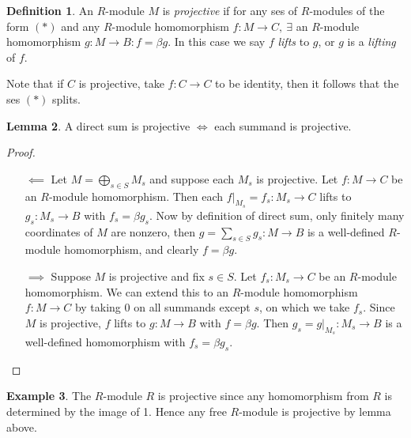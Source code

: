 \documentclass{article}
\theoremstyle{definition}
\newtheorem{defn}{Definition}[subsection]
\newtheorem{lemma}[defn]{Lemma}
\newtheorem{example}[defn]{Example}
\begin{document}
\begin{defn}
An $R$-module $M$ is \textit{projective} if for any ses of $R$-modules of the form $(\ast)$ and any $R$-module homomorphism $f:M\rightarrow C,\ \exists$ an $R$-module homomorphism $g:M\rightarrow B:f=\beta g$. In this case we say $f$ \textit{lifts} to $g$, or $g$ is a \textit{lifting} of $f$.

Note that if $C$ is projective, take $f:C\rightarrow C$ to be identity, then it follows that the ses $(\ast)$ splits. 
\end{defn}

\begin{lemma}
\label{lemma:MprojiffMsproj}
A direct sum is projective $\iff$ each summand is projective.
\end{lemma}
\begin{proof}
\begin{itemize}
\item[$\impliedby$] Let $M=\bigoplus_{s\in S}M_s$ and suppose each $M_s$ is projective. Let $f:M\rightarrow C$ be an $R$-module homomorphism. Then each $\left. f\right|_{M_s}=f_s:M_s\rightarrow C$ lifts to $g_s:M_s\rightarrow B$ with $f_s=\beta g_s$. Now by definition of direct sum, only finitely many coordinates of $M$ are nonzero, then $g=\sum_{s\in S}g_s:M\rightarrow B$ is a well-defined $R$-module homomorphism, and clearly $f=\beta g$.
\item[$\implies$] Suppose $M$ is projective and fix $s\in S$. Let $f_s:M_s\rightarrow C$ be an $R$-module homomorphism. We can extend this to an $R$-module homomorphism $f:M\rightarrow C$ by taking 0 on all summands except $s$, on which we take $f_s$. Since $M$ is projective, $f$ lifts to $g:M\rightarrow B$ with $f=\beta g$. Then $g_s=\left. g\right|_{M_s}:M_s\rightarrow B$ is a well-defined homomorphism with $f_s=\beta g_s$.
\end{itemize}
\end{proof}

\begin{example}
The $R$-module $R$ is projective since any homomorphism from $R$ is determined by the image of 1. Hence any free $R$-module is projective by lemma above.
\end{example}
\end{document}
